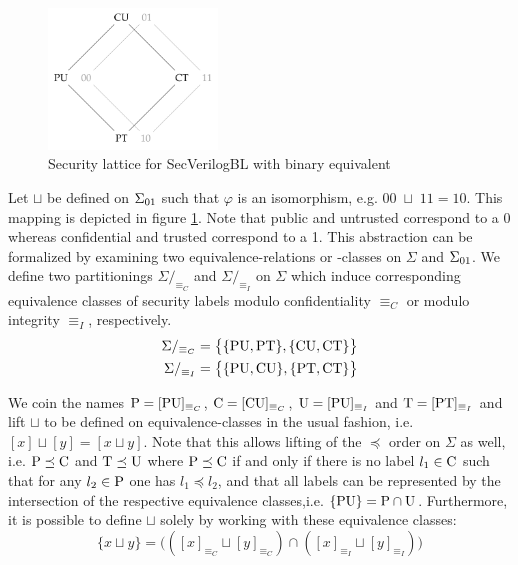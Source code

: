 \begin{figure}
    \centering
    \includegraphics[width=0.4\textwidth]{figures/binary-lattice.png}
    \caption{Security lattice for SecVerilogBL \cite{Ferraiuolo17} with binary equivalent}
    \label{fig:sec-lattice-bin}
\end{figure}

Let $ \sqcup $ be defined on $ \binSigma $ such that $ \varphi $ is an isomorphism, e.g. $ 00 \; \sqcup \; 11 = 10 $.
This mapping is depicted in figure \ref{fig:sec-lattice-bin}.
Note that public and untrusted correspond to a 0 whereas confidential and trusted correspond to a 1.
This abstraction can be formalized by examining two equivalence-relations or -classes on $ \Sigma $ and $ \binSigma $.
We define two partitionings $ \Sigma/_{\equiv_C} $ and $ \Sigma/_{\equiv_I} $ on $ \Sigma $ which induce corresponding equivalence classes of security labels modulo confidentiality $ \equiv_C $ or modulo integrity $ \equiv_I $, respectively.
\begin{align*}
    \Sigma /_{\equiv_C} &= \big\{ \{ \PU, \PT \}, \{ \CU, \CT \} \big\} \\
    \Sigma /_{\equiv_I} &= \big\{ \{ \PU, \CU \}, \{ \PT, \CT \} \big\}
\end{align*}

We coin the names $ \P = [\PU]_{\equiv_C} $, $ \C = [\CU]_{\equiv_C} $, $ \U = [\PU]_{\equiv_I} $ and $ \T = [\PT]_{\equiv_I} $ and lift $ \sqcup $ to be defined on equivalence-classes in the usual fashion, i.e. $ [x] \sqcup [y] = [x \sqcup y] $.
Note that this allows lifting of the $ \preceq $ order on $ \Sigma $ as well, i.e. $ \P \preceq \C $ and $ \T \preceq \U $ where $ \P \preceq \C $ if and only if there is no label $ l_1 \in \C $ such that for any $ l_2 \in \P $ one has $ l_1 \preceq l_2 $, and that all labels can be represented by the intersection of the respective equivalence classes,i.e. $ \{ \PU \} = \P \cap \U $.
Furthermore, it is possible to define $ \sqcup $ solely by working with these equivalence classes:
\begin{equation*}
    \{ x \sqcup y \} = \big(([x]_{\equiv_C} \sqcup [y]_{\equiv_C}) \cap ([x]_{\equiv_I} \sqcup [y]_{\equiv_I}) \big)
\end{equation*}

